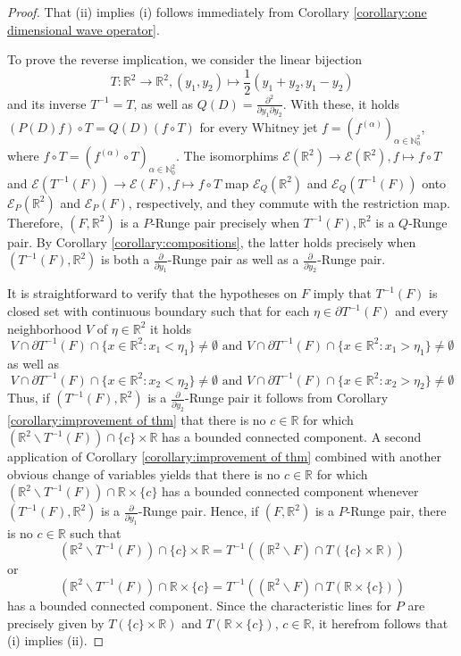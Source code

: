 \documentclass[10pt,leqno]{amsart}
\theoremstyle{definition}
\newcommand{\R}{\mathbb R}
\newcommand{\N}{\mathbb N}
\begin{document}
\begin{proof}
	That (ii) implies (i) follows immediately from Corollary \ref{corollary:one dimensional wave operator}.
	
	To prove the reverse implication, we consider the linear bijection
	$$T:\R^2\rightarrow\R^2, (y_1,y_2)\mapsto\frac{1}{2} (y_1+y_2, y_1-y_2)$$
	and its inverse $T^{-1}=T$, as well as $Q(D)=\frac{\partial^2}{\partial y_1\partial y_2}$. With these, it holds $(P(D)f)\circ T=Q(D)(f\circ T)$ for every Whitney jet $f=(f^{(\alpha)})_{\alpha\in\N_0^2}$, where $f\circ T=(f^{(\alpha)}\circ T)_{\alpha\in\N_0^2}$. The isomorphims $\mathscr{E}(\R^2)\rightarrow\mathscr{E}(\R^2), f\mapsto f\circ T$ and $\mathscr{E}(T^{-1}(F))\rightarrow\mathscr{E}(F), f\mapsto f\circ T$ map $\mathscr{E}_Q(\R^2)$ and $\mathscr{E}_Q(T^{-1}(F))$ onto $\mathscr{E}_P(\R^2)$ and $\mathscr{E}_P(F)$, respectively, and they commute with the restriction map. Therefore, $(F,\R^2)$ is a $P$-Runge pair precisely when $T^{-1}(F), \R^2$ is a $Q$-Runge pair. By Corollary \ref{corollary:compositions}, the latter holds precisely when $(T^{-1}(F), \R^2)$ is both a $\frac{\partial}{\partial y_1}$-Runge pair as well as a $\frac{\partial}{\partial y_2}$-Runge pair.
	
	It is straightforward to verify that the hypotheses on $F$ imply that $T^{-1}(F)$ is closed set with continuous boundary such that for each $\eta\in\partial T^{-1}(F)$ and every neighborhood $V$ of $\eta\in\R^2$ it holds 
	$$V\cap\partial T^{-1}(F)\cap\{x\in\R^2: x_1<\eta_1\}\neq \emptyset\text{ and }V\cap\partial T^{-1}(F)\cap\{x\in\R^2: x_1>\eta_1\}\neq \emptyset$$
	as well as
	$$V\cap\partial T^{-1}(F)\cap\{x\in\R^2: x_2<\eta_2\}\neq\emptyset\text{ and }V\cap\partial T^{-1}(F)\cap\{x\in\R^2: x_2>\eta_2\}\neq\emptyset$$
	Thus, if $(T^{-1}(F), \R^2)$ is a $\frac{\partial}{\partial y_2}$-Runge pair it follows from Corollary \ref{corollary:improvement of thm} that there is no $c\in\R$ for which $(\R^2\backslash T^{-1}(F))\cap \{c\}\times\R$ has a bounded connected component. A second application of Corollary \ref{corollary:improvement of thm} combined with another obvious change of variables yields that there is no $c\in\R$ for which $(\R^2\backslash T^{-1}(F))\cap \R\times\{c\}$ has a bounded connected component whenever $(T^{-1}(F), \R^2)$ is a $\frac{\partial}{\partial y_1}$-Runge pair. Hence, if $(F,\R^2)$ is a $P$-Runge pair, there is no $c\in\R$ such that
	$$(\R^2\backslash T^{-1}(F))\cap \{c\}\times\R=T^{-1}\left((\R^2\backslash F)\cap T(\{c\}\times\R)\right)$$
	or
	$$(\R^2\backslash T^{-1}(F))\cap \R\times \{c\}=T^{-1}\left((\R^2\backslash F)\cap T(\R\times \{c\})\right)$$
	has a bounded connected component. Since the characteristic lines for $P$ are precisely given by $T(\{c\}\times\R)$ and $T(\R\times \{c\})$, $c\in\R$, it herefrom follows that (i) implies (ii).
\end{proof}
\end{document}
